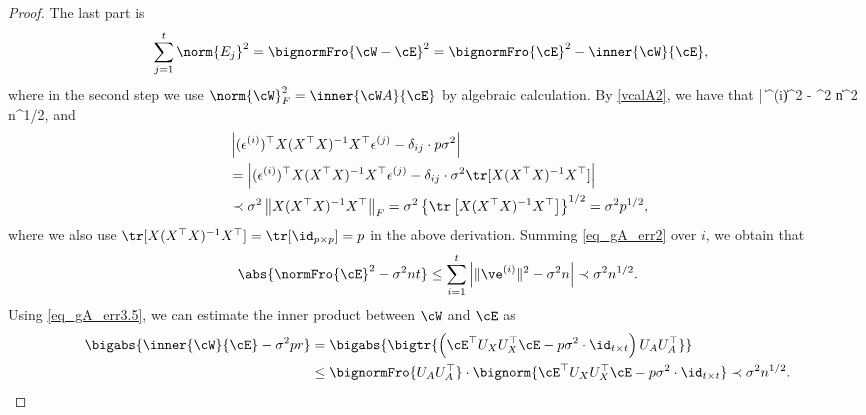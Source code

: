 \documentclass[aos,preprint]{imsart}
\begin{document}
\begin{proof}
\medskip
	  The last part is %
	\begin{align}\label{eq_gA_p3}
		\sum_{j=1}^t \norm{E_j}^2 &= \bignormFro{\cW  - \cE}^2
		= \bignormFro{\cE}^2 - \inner{\cW }{\cE},
	\end{align}
	where in the second step we use $\norm{\cW}_F^2 = \inner{\cW A}{\cE}$ by algebraic calculation.
	By \eqref{vcalA2}, we have that
	\be\label{eq_gA_err2} \left| \| \ve^{(i)}\|^2 - \sigma^2 n\right\| \prec \sigma^2 n^{1/2},\ee
	and
	\begin{align}
	 &  \left|(\epsilon^{(i)})^\top X(X^{\top} X)^{-1} X^{\top} \epsilon^{(j)} - \delta_{ij}\cdot p\sigma^2 \right| \nonumber\\
	 & =\left|(\epsilon^{(i)})^\top X(X^{\top} X)^{-1} X^{\top} \epsilon^{(j)} - \delta_{ij}\cdot \sigma^2 \tr[X(X^{\top} X)^{-1} X^{\top} ]\right| \nonumber\\
	 & \prec \sigma^2 \left\|X(X^{\top} X)^{-1} X^{\top}\right\|_F = \sigma^2\left\{ \tr\left[ X(X^{\top} X)^{-1} X^{\top}\right] \right\}^{1/2}= \sigma^2 p^{1/2}, \label{eq_gA_err3.5}
	\end{align}
	where we also use $ \tr[X(X^{\top} X)^{-1} X^{\top} ]= \tr [\id_{p\times p}] =p$ in the above derivation. 
	Summing \eqref{eq_gA_err2} over $i$, we obtain that %
	\begin{align}
		\abs{\normFro{\cE}^2 - \sigma^2 n t}\le \sum_{i=1}^t \left| \|\ve^{(i)}\|^2 - \sigma^2 n \right|\prec  \sigma^2 n^{1/2}. \label{eq_gA_err3}
	\end{align}
	Using \eqref{eq_gA_err3.5}, we can estimate the inner product between $\cW $ and $\cE$ as %
	\begin{align}
		\bigabs{\inner{\cW }{\cE} - \sigma^2 pr} &= \bigabs{\bigtr{\left(\cE^\top U_X U_X^{\top}\cE  - p\sigma^2 \cdot  \id_{t\times t} \right)  U_AU_A^{\top} }} \nonumber  \\
		&\le \bignormFro{U_{A} U_A^{\top}} \cdot \bignorm{\cE^\top U_X U_X^{\top} \cE - p \sigma^2 \cdot  \id_{t\times t}} \prec \sigma^2 n^{1/2} .\label{eq_gA_err4}
	\end{align}

\end{proof}
\end{document}
